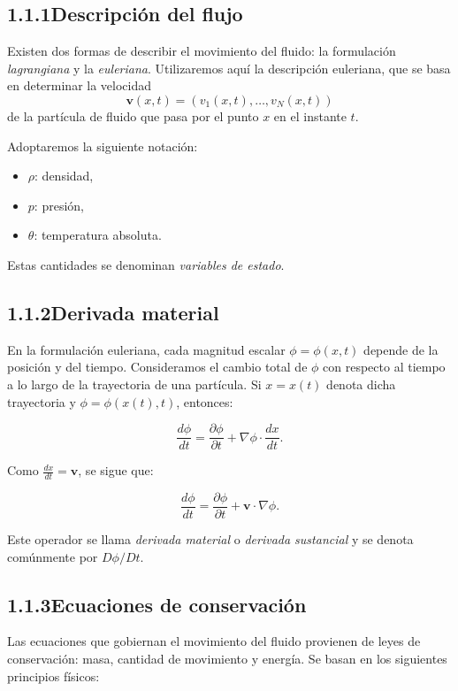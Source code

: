 \documentclass[12pt,a4paper]{article}
\begin{document}
\subsection*{1.1.1\quad Descripción del flujo}

Existen dos formas de describir el movimiento del fluido: la formulación \textit{lagrangiana} y la \textit{euleriana}. Utilizaremos aquí la descripción euleriana, que se basa en determinar la velocidad
\[
\bm{v}(x,t) = (v_1(x,t), \dots, v_N(x,t))
\]
de la partícula de fluido que pasa por el punto $x$ en el instante $t$.

Adoptaremos la siguiente notación:
\begin{itemize}
  \item $\rho$: densidad,
  \item $p$: presión,
  \item $\theta$: temperatura absoluta.
\end{itemize}
Estas cantidades se denominan \textit{variables de estado}.


\subsection*{1.1.2\quad Derivada material}

En la formulación euleriana, cada magnitud escalar $\phi = \phi(x,t)$ depende de la posición y del tiempo. Consideramos el cambio total de $\phi$ con respecto al tiempo a lo largo de la trayectoria de una partícula. Si $x = x(t)$ denota dicha trayectoria y $\phi = \phi(x(t),t)$, entonces:

\[
\frac{d\phi}{dt} = \frac{\partial \phi}{\partial t} + \nabla \phi \cdot \frac{dx}{dt}.
\]

Como $\frac{dx}{dt} = \bm{v}$, se sigue que:

\begin{equation}
\frac{d\phi}{dt} = \frac{\partial \phi}{\partial t} + \bm{v} \cdot \nabla \phi.
\tag{1.1}
\end{equation}

Este operador se llama \textit{derivada material} o \textit{derivada sustancial} y se denota comúnmente por $D\phi/Dt$.

\subsection*{1.1.3\quad Ecuaciones de conservación}

Las ecuaciones que gobiernan el movimiento del fluido provienen de leyes de conservación: masa, cantidad de movimiento y energía. Se basan en los siguientes principios físicos:
\end{document}
